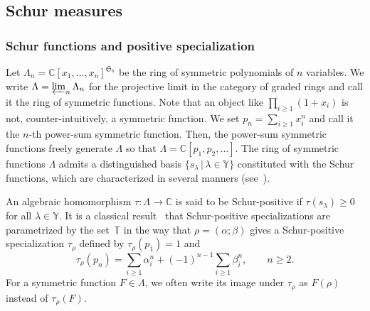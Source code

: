 \documentclass[pdftex]{sigma}
\numberwithin{equation}{section}
\newcommand{\mfrak}[1]{\mathfrak{#1}}
\newcommand{\mbb}[1]{\mathbb{#1}}
\begin{document}
\subsection{Schur measures}\label{subsect:Schur_measures}
\subsubsection{Schur functions and positive specialization}
Let $\Lambda_{n}=\mbb{C}[x_{1},\dots, x_{n}]^{\mfrak{S}_{n}}$ be the ring of symmetric polynomials of $n$ variables. We write $\Lambda=\varprojlim_{n}\Lambda_{n}$ for the projective limit in the category of graded rings and call it the ring of symmetric functions. Note that an object like $\prod_{i\ge 1}(1+x_{i})$ is not, counter-intuitively, a symmetric function. We set $p_{n}=\sum_{i\ge 1}x_{i}^{n}$ and call it the $n$-th power-sum symmetric function. Then, the power-sum symmetric functions freely generate $\Lambda$ so that $\Lambda=\mbb{C}[p_{1},p_{2},\dots]$. The ring of symmetric functions $\Lambda$ admits a distinguished basis $\{s_{\lambda}\,|\,\lambda\in\mbb{Y}\}$ constituted with the Schur functions, which are characterized in several manners (see~\cite{Macdonald1999}).

An algebraic homomorphism $\tau\colon \Lambda\to\mbb{C}$ is said to be Schur-positive if $\tau(s_{\lambda})\ge 0$ for all $\lambda\in\mbb{Y}$. It is a classical result~\cite{AissenSchoenbergWhitney1952, Edrei1952, Thoma1964} that Schur-positive specializations are parametrized by the set~$\mbb{T}$ in the way that $\rho=(\alpha;\beta)$ gives a Schur-positive specialization $\tau_{\rho}$ defined by $\tau_{\rho}(p_{1})=1$ and
\begin{equation*}
	\tau_{\rho}(p_{n})=\sum_{i\ge 1}\alpha_{i}^{n}+(-1)^{n-1}\sum_{i\ge 1}\beta_{i}^{n},\qquad n\ge 2.
\end{equation*}
For a symmetric function $F\in \Lambda$, we often write its image under $\tau_{\rho}$ as $F(\rho)$ instead of $\tau_{\rho}(F)$.
\end{document}
